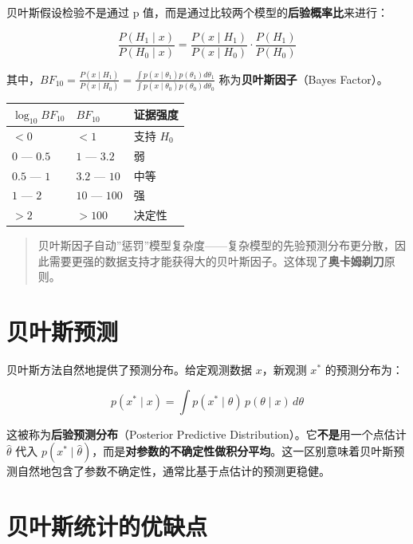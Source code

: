\documentclass[
]{book}
\begin{document}
贝叶斯假设检验不是通过 p 值，而是通过比较两个模型的\textbf{后验概率比}来进行：

\[\frac{P(H_1 \mid x)}{P(H_0 \mid x)} = \frac{P(x \mid H_1)}{P(x \mid H_0)} \cdot \frac{P(H_1)}{P(H_0)}\]

其中，\(BF_{10} = \frac{P(x \mid H_1)}{P(x \mid H_0)} = \frac{\int p(x \mid \theta_1) p(\theta_1) d\theta_1}{\int p(x \mid \theta_0) p(\theta_0) d\theta_0}\) 称为\textbf{贝叶斯因子}（Bayes Factor）。

\begin{longtable}[]{@{}lll@{}}
\toprule\noalign{}
\(\log_{10} BF_{10}\) & \(BF_{10}\) & 证据强度 \\
\midrule\noalign{}
\endhead
\bottomrule\noalign{}
\endlastfoot
\(< 0\) & \(< 1\) & 支持 \(H_0\) \\
\(0\) --- \(0.5\) & \(1\) --- \(3.2\) & 弱 \\
\(0.5\) --- \(1\) & \(3.2\) --- \(10\) & 中等 \\
\(1\) --- \(2\) & \(10\) --- \(100\) & 强 \\
\(> 2\) & \(> 100\) & 决定性 \\
\end{longtable}

\begin{quote}
贝叶斯因子自动''惩罚''模型复杂度------复杂模型的先验预测分布更分散，因此需要更强的数据支持才能获得大的贝叶斯因子。这体现了\textbf{奥卡姆剃刀}原则。
\end{quote}

\section{贝叶斯预测}\label{ux8d1dux53f6ux65afux9884ux6d4b}

贝叶斯方法自然地提供了预测分布。给定观测数据 \(x\)，新观测 \(x^*\) 的预测分布为：

\[p(x^* \mid x) = \int p(x^* \mid \theta) \, p(\theta \mid x) \, d\theta\]

这被称为\textbf{后验预测分布}（Posterior Predictive Distribution）。它\textbf{不是}用一个点估计 \(\hat{\theta}\) 代入 \(p(x^* \mid \hat{\theta})\)，而是\textbf{对参数的不确定性做积分平均}。这一区别意味着贝叶斯预测自然地包含了参数不确定性，通常比基于点估计的预测更稳健。

\section{贝叶斯统计的优缺点}\label{ux8d1dux53f6ux65afux7edfux8ba1ux7684ux4f18ux7f3aux70b9}
\end{document}
